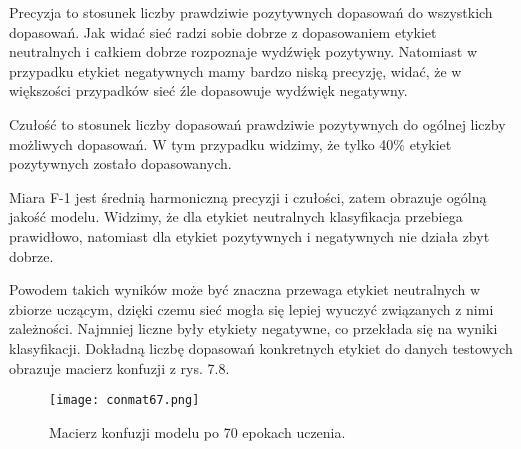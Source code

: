 Precyzja to stosunek liczby prawdziwie pozytywnych dopasowań do wszystkich dopasowań. Jak widać sieć radzi sobie dobrze z dopasowaniem etykiet neutralnych i całkiem dobrze rozpoznaje wydźwięk pozytywny. Natomiast w przypadku etykiet negatywnych mamy bardzo niską precyzję, widać, że w większości przypadków sieć źle dopasowuje wydźwięk negatywny.

Czułość to stosunek liczby dopasowań prawdziwie pozytywnych do ogólnej liczby możliwych dopasowań. W tym przypadku widzimy, że tylko 40\% etykiet pozytywnych zostało dopasowanych. 

Miara F-1 jest średnią harmoniczną precyzji i czułości, zatem obrazuje ogólną jakość modelu. Widzimy, że dla etykiet neutralnych klasyfikacja przebiega prawidłowo, natomiast dla etykiet pozytywnych i negatywnych nie działa zbyt dobrze. 

Powodem takich wyników może być znaczna przewaga etykiet neutralnych w zbiorze uczącym, dzięki czemu sieć mogła się lepiej wyuczyć związanych z nimi zależności. Najmniej liczne były etykiety negatywne, co przekłada się na wyniki klasyfikacji. Dokładną liczbę dopasowań konkretnych etykiet do danych testowych obrazuje macierz konfuzji z rys. 7.8.


\label{sec:etykiety}
\begin{figure}[H]
    \centering
    \texttt{[image: conmat67.png]}
    \caption{Macierz konfuzji modelu po 70 epokach uczenia.}
\end{figure}


